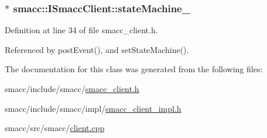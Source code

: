 \subsubsection[{\texorpdfstring{state\+Machine\+\_\+}{stateMachine_}}]{$\ast$ smacc\+::\+I\+Smacc\+Client\+::state\+Machine\+\_\+\hspace{0.3cm}{\ttfamily [protected]}}\hypertarget{classsmacc_1_1ISmaccClient_a926e4f2ae796def63d48dca389a48c47}{}\label{classsmacc_1_1ISmaccClient_a926e4f2ae796def63d48dca389a48c47}


Definition at line 34 of file smacc\+\_\+client.\+h.



Referenced by post\+Event(), and set\+State\+Machine().



The documentation for this class was generated from the following files\+:\begin{DoxyCompactItemize}
\item 
smacc/include/smacc/\hyperlink{smacc__client_8h}{smacc\+\_\+client.\+h}\item 
smacc/include/smacc/impl/\hyperlink{smacc__client__impl_8h}{smacc\+\_\+client\+\_\+impl.\+h}\item 
smacc/src/smacc/\hyperlink{client_8cpp}{client.\+cpp}\end{DoxyCompactItemize}
